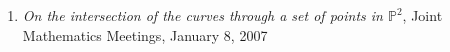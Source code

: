 \documentclass[12pt]{article}
\begin{document}
\begin{enumerate}
\item \textit{On the intersection of the curves through a set of points in $\mathbb{P}^2$},
Joint Mathematics Meetings, January 8, 2007




\end{enumerate}


\end{document}
